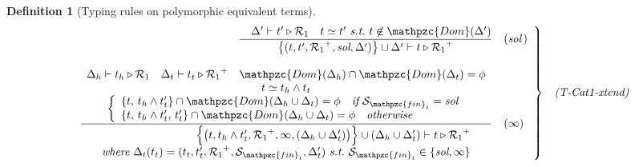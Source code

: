 \documentclass[12pt]{article}
\newtheorem{Definition}{Definition}[section]
\begin{document}
\begin{Definition}[Typing rules on polymorphic equivalent terms]
\begin{displaymath}
\begin{array}{c}
      \begin{array}{rl}
        \left. \begin{array}{rl}
          \dfrac{
            \quad \Delta' \vdash t' \triangleright \mathcal{R}_1 \quad
             t \simeq t'\ \text{\it s.t.}\ t \not\in \mathpzc{Dom}(\Delta')
          }{
            \bigl\{(t, t', {\mathcal{R}_1}^+, \text{\it sol}, \Delta')
             \bigr\} \cup \Delta' \vdash
              t \triangleright {\mathcal{R}_1}^+
          }  &  (\text{\it sol}\,)  \\
          \\
          \dfrac{
            \begin{array}{c}
              \Delta_h \vdash t_h \triangleright \mathcal{R}_1
               \quad \Delta_t \vdash t_t \triangleright {\mathcal{R}_1}^+
                \quad \mathpzc{Dom}(\Delta_h) \cap \mathpzc{Dom}(\Delta_t)
                 = \phi  \\
              t \simeq t_h \wedge t_t  \\
              \left\{\begin{array}{l}
                \{t,\, t_h \wedge t'_t \} \cap \mathpzc{Dom}(
                 \Delta_h \cup \Delta_t) = \phi\quad \text{\it if}\
                  \mathcal{S}_{\mathpzc{fin}_t} = \text{\it sol}  \\
                \{t,\, t_h \wedge t'_t,\, t'_t \} \cap \mathpzc{Dom}(
                 \Delta_h \cup \Delta_t) = \phi\quad \text{\it otherwise}
              \end{array}\right.
            \end{array}
          }{
            \begin{array}{r}
              \Bigl\{\bigl(t, t_h \wedge t_t', {\mathcal{R}_1}^+, \infty,
               (\Delta_h \cup \Delta_t') \bigr) \Bigr\} \cup
                (\Delta_h \cup \Delta_t') \vdash
                 t \triangleright {\mathcal{R}_1}^+  \\
              \text{\it where}\
               \Delta_t(t_t) = (t_t, t_t', {\mathcal{R}_1}^+,
                \mathcal{S}_{\mathpzc{fin}_t}, \Delta_t')\ \text{\it s.t.}\
                 \mathcal{S}_{\mathpzc{fin}_t} \in \{\text{\it sol}, \infty\}
            \end{array}
          }  &  (\infty)
        \end{array} \right\}  &  \text{\it (T-Cat1-xtend)}
      \end{array}  \\
      \\
      

\end{array}
\end{displaymath}
\end{Definition}
\end{document}
